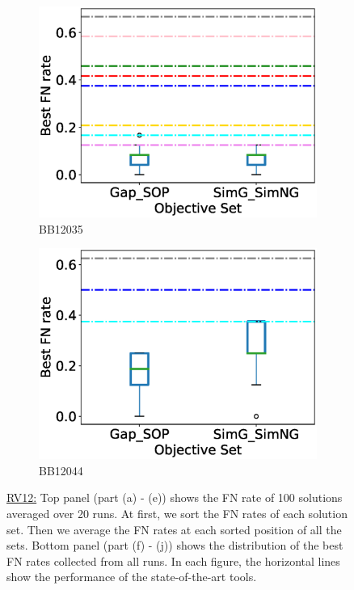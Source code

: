 \begin{figure}[!htbp]
\begin{adjustwidth}{-1cm}{-1cm}
\begin{subfigure}{0.22\textwidth}
			\includegraphics[width=\columnwidth]{Figure/summary/precomputedInit/Balibase/BB12035_objset_fnrate_rank}
			\caption{BB12035}
		\end{subfigure}
		\begin{subfigure}{0.22\textwidth}
			\includegraphics[width=\columnwidth]{Figure/summary/precomputedInit/Balibase/BB12044_objset_fnrate_rank}
			\caption{BB12044}
		\end{subfigure}
		\caption{\underline{RV12:} Top panel (part (a) - (e)) shows the FN rate of 100 solutions averaged over 20 runs. At first, we sort the FN rates of each solution set. Then we average the FN rates at each sorted position of all the sets. Bottom panel (part (f) - (j)) shows the distribution of the best FN rates collected from all runs. In each figure, the horizontal lines show the performance of the state-of-the-art tools.}
		\label{fig:rv12_fn_rate}
	\end{adjustwidth}
\end{figure}


